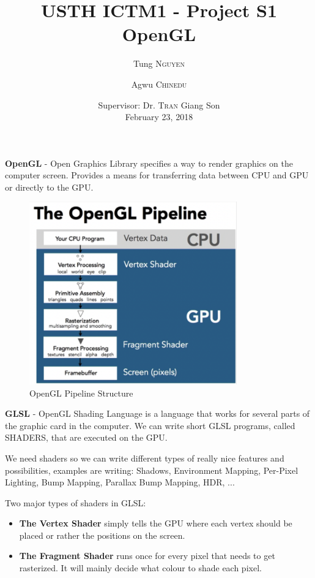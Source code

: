 \documentclass{article}
\title{USTH ICTM1 - Project S1 \\ \bigskip OpenGL}
\author{Tung \textsc{Nguyen} \and Agwu \textsc{Chinedu}}
\date{Supervisor: Dr. \textsc{Tran} Giang Son \\ \medskip
February 23, 2018}
\begin{document}
\maketitle

\textbf{OpenGL} - Open Graphics Library specifies a way to render graphics on the computer
screen. Provides a means for transferring data between CPU and GPU or directly to the GPU.

\begin{figure}[h]
\begin{center}
\includegraphics[width=0.8\textwidth]{pipeline}
\caption{OpenGL Pipeline Structure \footnotemark}
\end{center}
\end{figure}

\textbf{GLSL} - OpenGL Shading Language is a language that works for several parts of the graphic card in the computer. We can write short GLSL programs, called SHADERS, that are executed on the GPU. \par

We need shaders so we can write different types of really nice features and possibilities, examples are writing: Shadows, Environment Mapping, Per-Pixel Lighting, Bump Mapping, Parallax Bump Mapping, HDR, ... \par

Two major types of shaders in GLSL:
\begin{itemize}
  \item \textbf{The Vertex Shader} simply tells the GPU where each vertex should be placed or rather the positions on the screen.
  \item \textbf{The Fragment Shader} runs once for every pixel that needs to get rasterized. It will mainly decide what colour to shade each pixel.
\end{itemize}
\end{document}
